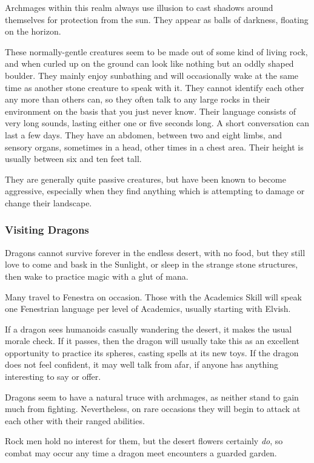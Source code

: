 \begin{multicols}{2}
Archmages within this realm always use illusion to cast shadows around themselves for protection from the sun.
They appear as balls of darkness, floating on the horizon.


\label{rockman}

These normally-gentle creatures seem to be made out of some kind of living rock, and when curled up on the ground can look like nothing but an oddly shaped boulder.
They mainly enjoy sunbathing and will occasionally wake at the same time as another stone creature to speak with it.
They cannot identify each other any more than others can, so they often talk to any large rocks in their environment on the basis that you just never know.
Their language consists of very long sounds, lasting either one or five seconds long.
A short conversation can last a few days.
They have an abdomen, between two and eight limbs, and sensory organs, sometimes in a head, other times in a chest area.
Their height is usually between six and ten feet tall.

They are generally quite passive creatures, but have been known to become aggressive, especially when they find anything which is attempting to damage or change their landscape.


\subsubsection{Visiting Dragons}

Dragons cannot survive forever in the endless desert, with no food, but they still love to come and bask in the Sunlight, or sleep in the strange stone structures, then wake to practice magic with a glut of mana.

\dragon

Many travel to Fenestra on occasion.
Those with the Academics Skill will speak one Fenestrian language per level of Academics, usually starting with Elvish.

If a dragon sees humanoids casually wandering the desert, it makes the usual morale check.
If it passes, then the dragon will usually take this as an excellent opportunity to practice its spheres, casting spells at its new toys.
If the dragon does not feel confident, it may well talk from afar, if anyone has anything interesting to say or offer.

Dragons seem to have a natural truce with archmages, as neither stand to gain much from fighting.
Nevertheless, on rare occasions they will begin to attack at each other with their ranged abilities.

Rock men hold no interest for them, but the desert flowers certainly \emph{do}, so combat may occur any time a dragon meet encounters a guarded garden.

\end{multicols}

